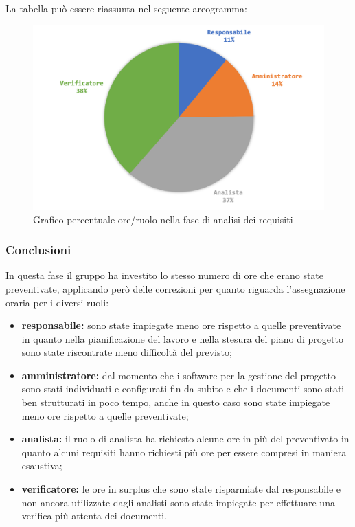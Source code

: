 			La tabella può essere riassunta nel seguente areogramma:
			\begin{figure}[H]
				\centering
				\includegraphics[width=0.8\linewidth]{images/consuntivo/analisiCons2.png}
				\caption{Grafico percentuale ore/ruolo nella fase di analisi dei requisiti}
				\label{fig:consuntivo2 grafico costi ruolo fase analisi dei requisiti}
			\end{figure}
		\subsubsection{Conclusioni}
			In questa fase il gruppo ha investito lo stesso numero di ore che erano state preventivate, applicando però delle correzioni per quanto riguarda l'assegnazione oraria per i diversi ruoli:
			\begin{itemize}
				\item \textbf{responsabile:} sono state impiegate meno ore rispetto a quelle preventivate in quanto nella pianificazione del lavoro e nella stesura del piano di progetto sono state riscontrate meno difficoltà del previsto;	 
				\item \textbf{amministratore:} dal momento che i software per la gestione del progetto sono stati individuati e configurati fin da subito e che i documenti sono stati ben strutturati in poco tempo, anche in questo caso sono state impiegate meno ore rispetto a quelle preventivate;
				\item \textbf{analista:} il ruolo di analista ha richiesto alcune ore in più del preventivato in quanto alcuni requisiti hanno richiesti più ore per essere compresi in maniera esaustiva;
				\item \textbf{verificatore:} le ore in surplus che sono state risparmiate dal responsabile e non ancora utilizzate dagli analisti sono state impiegate per effettuare una verifica più attenta dei documenti.  
			\end{itemize}
